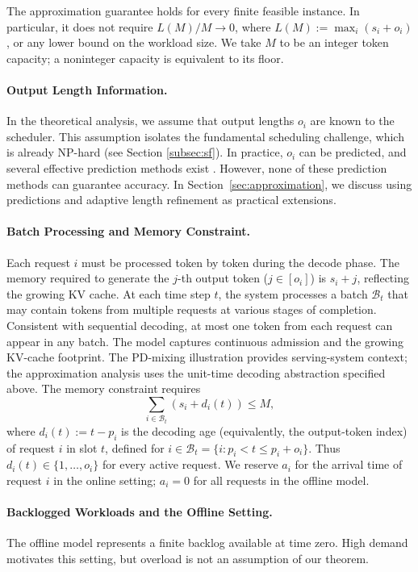 \documentclass[nonblindrev]{informs3_hide}
\begin{document}
The approximation guarantee holds for every finite feasible instance. In particular, it does not require $L(M)/M\to0$, where $L(M):=\max_i(s_i+o_i)$, or any lower bound on the workload size. We take $M$ to be an integer token capacity; a noninteger capacity is equivalent to its floor.

\paragraph{Output Length Information.}
In the theoretical analysis, we assume that output lengths \(o_i\) are known to the scheduler. This assumption isolates the fundamental scheduling challenge, which is already NP-hard (see Section \ref{subsec:sf}). In practice, \(o_i\) can be predicted, and several effective prediction methods exist \citep{zheng2023response,qiu2024efficient,shahout2024don}. However, none of these prediction methods can guarantee accuracy. In Section~\ref{sec:approximation}, we discuss using predictions and adaptive length refinement as practical extensions.

\paragraph{Batch Processing and Memory Constraint.} Each request \(i\) must be processed token by token during the decode phase. The memory required to generate the \(j\)-th output token (\(j \in [o_i]\)) is \(s_i + j\), reflecting the growing KV cache. At each time step \(t\), the system processes a batch \(\mathcal{B}_t\)  that may contain tokens from multiple requests at various stages of completion. Consistent with sequential decoding, at most one token from each request can appear in any batch. The model captures continuous admission and the growing KV-cache footprint. The PD-mixing illustration provides serving-system context; the approximation analysis uses the unit-time decoding abstraction specified above. The memory constraint requires
\[
\sum_{i \in \mathcal{B}_t} (s_i + d_i(t)) \leq M,
\]
where $d_i(t):=t-p_i$ is the decoding age (equivalently, the output-token index) of request $i$ in slot $t$, defined for $i\in\mathcal B_t=\{i:p_i<t\le p_i+o_i\}$. Thus $d_i(t)\in\{1,\ldots,o_i\}$ for every active request. We reserve $a_i$ for the arrival time of request $i$ in the online setting; $a_i=0$ for all requests in the offline model.

\paragraph{Backlogged Workloads and the Offline Setting.}
The offline model represents a finite backlog available at time zero. High demand motivates this setting, but overload is not an assumption of our theorem.
\end{document}
